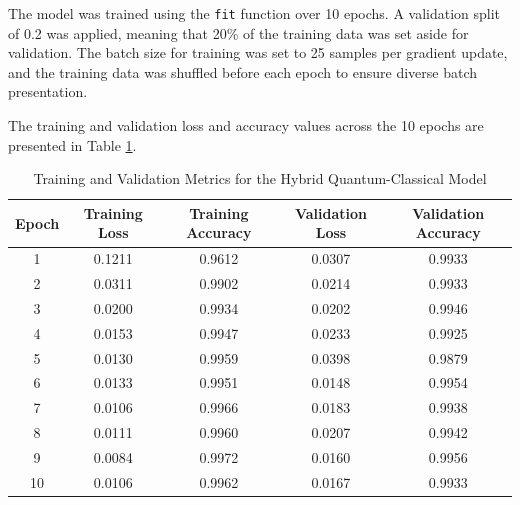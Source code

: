 \documentclass[10pt]{article}
\begin{document}
\noindent The model was trained using the \texttt{fit} function over 10 epochs. A validation split of 0.2 was applied, meaning that 20\% of the training data was set aside for validation. The batch size for training was set to 25 samples per gradient update, and the training data was shuffled before each epoch to ensure diverse batch presentation.

\noindent The training and validation loss and accuracy values across the 10 epochs are presented in Table \ref{tab:training_validation_metrics}.

\begin{table}[H]
    \centering
    \caption{Training and Validation Metrics for the Hybrid Quantum-Classical Model}
    \label{tab:training_validation_metrics}
    \begin{tabular}{|c|c|c|c|c|}
        \hline
        \textbf{Epoch} & \textbf{Training Loss} & \textbf{Training Accuracy} & \textbf{Validation Loss} & \textbf{Validation Accuracy} \\
        \hline
        1 & 0.1211 & 0.9612 & 0.0307 & 0.9933 \\
        2 & 0.0311 & 0.9902 & 0.0214 & 0.9933 \\
        3 & 0.0200 & 0.9934 & 0.0202 & 0.9946 \\
        4 & 0.0153 & 0.9947 & 0.0233 & 0.9925 \\
        5 & 0.0130 & 0.9959 & 0.0398 & 0.9879 \\
        6 & 0.0133 & 0.9951 & 0.0148 & 0.9954 \\
        7 & 0.0106 & 0.9966 & 0.0183 & 0.9938 \\
        8 & 0.0111 & 0.9960 & 0.0207 & 0.9942 \\
        9 & 0.0084 & 0.9972 & 0.0160 & 0.9956 \\
        10 & 0.0106 & 0.9962 & 0.0167 & 0.9933 \\
        \hline
    \end{tabular}
\end{table}
\end{document}
